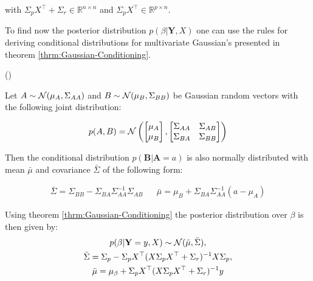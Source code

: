 with $\Sigma_p X^{\top} + \Sigma_r \in \mathbb{R}^{n\times n}$ and $\Sigma_p X^{\top} \in \mathbb{R}^{p\times n}$.

To find now the posterior distribution $p(\beta | \mathbf{Y}, X)$ one can use the rules for deriving conditional
distributions for multivariate Gaussian's presented in theorem \ref{thrm:Gaussian-Conditioning}.

\begin{theorem}\label{thrm:Gaussian-Conditioning} (\citeauthor{von_mises_mathematical_1964})

Let $A \sim \operatorname{\mathcal{N}}(\mu_A, \Sigma_{AA})$ and $B \sim \operatorname{\mathcal{N}}(\mu_B, \Sigma_{BB})$ be
Gaussian random vectors with the following joint distribution:

\begin{gather*}
    p(A, B) = \operatorname{\mathcal{N}} \left(
    \begin{bmatrix}
        \mu_A \\
        \mu_B
    \end{bmatrix},
    \begin{bmatrix}
        \Sigma_{AA} & \Sigma_{AB} \\
        \Sigma_{BA} & \Sigma_{BB}
    \end{bmatrix}
    \right)
\end{gather*}

Then the conditional distribution $p(\mathbf{B} | \mathbf{A}=a)$ is also normally distributed
with mean $\bar{\mu}$ and covariance $\bar{\Sigma}$ of the following form:

\begin{align*}
    \bar{\Sigma} = \Sigma_{B B} - \Sigma_{B A} \Sigma_{A A}^{-1} \Sigma_{A B} & & \bar{\mu} = \mu_{B} + \Sigma_{BA} \Sigma_{AA}^{-1}(a - \mu_A)
\end{align*}


\end{theorem}



Using theorem \ref{thrm:Gaussian-Conditioning} the posterior distribution over $\beta$ is then given by:
\begin{gather*}
    p(\beta | \mathbf{Y}=y, X) \sim \operatorname{\mathcal{N}}(\bar{\mu}, \bar{\Sigma}), \\
    \bar{\Sigma} = \Sigma_{p} - \Sigma_p X^{\top}(X \Sigma_p X^{\top} + \Sigma_r)^{-1} X  \Sigma_p, \\
    \bar{\mu} = \mu_{\beta} + \Sigma_p X^{\top}(X \Sigma_p X^{\top} + \Sigma_r)^{-1}y
\end{gather*}

